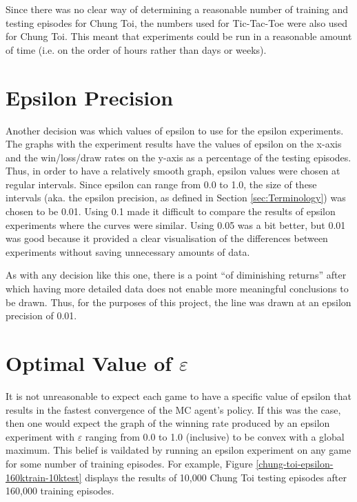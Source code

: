 \documentclass[11pt,a4paper]{report}
\begin{document}
Since there was no clear way of determining a reasonable number of training and testing episodes for Chung Toi, the numbers used for Tic-Tac-Toe were also used for Chung Toi. This meant that experiments could be run in a reasonable amount of time (i.e. on the order of hours rather than days or weeks).


\section{Epsilon Precision}
\label{sec:epsilon-precision}

Another decision was which values of epsilon to use for the epsilon experiments. The graphs with the experiment results have the values of epsilon on the x-axis and the win/loss/draw rates on the y-axis as a percentage of the testing episodes. Thus, in order to have a relatively smooth graph, epsilon values were chosen at regular intervals. Since epsilon can range from 0.0 to 1.0, the size of these intervals (aka. the epsilon precision, as defined in Section \ref{sec:Terminology}) was chosen to be 0.01. Using 0.1 made it difficult to compare the results of epsilon experiments where the curves were similar. Using 0.05 was a bit better, but 0.01 was good because it provided a clear visualisation of the differences between experiments without saving unnecessary amounts of data.

As with any decision like this one, there is a point ``of diminishing returns'' after which having more detailed data does not enable more meaningful conclusions to be drawn. Thus, for the purposes of this project, the line was drawn at an epsilon precision of 0.01.


\section{Optimal Value of $\varepsilon$}
\label{sec:optimal_epsilon}

It is not unreasonable to expect each game to have a specific value of epsilon that results in the fastest convergence of the MC agent's policy. If this was the case, then one would expect the graph of the winning rate produced by an epsilon experiment with $\varepsilon$ ranging from 0.0 to 1.0 (inclusive) to be convex with a global maximum. This belief is vaildated by running an epsilon experiment on any game for some number of training episodes. For example, Figure \ref{chung-toi-epsilon-160ktrain-10ktest} displays the results of 10,000 Chung Toi testing episodes after 160,000 training episodes.
\end{document}
